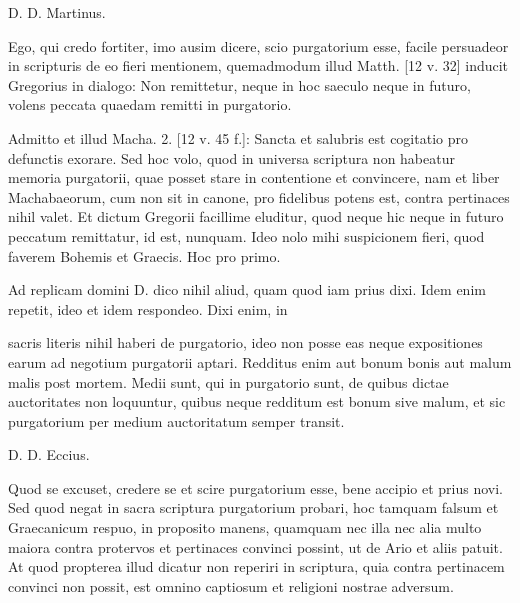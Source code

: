 D. D. Martinus.

Ego, qui credo fortiter, imo ausim dicere, scio purgatorium esse, facile persuadeor in scripturis de eo fieri mentionem, quemadmodum illud Matth. [12 v. 32] inducit Gregorius in dialogo: Non remittetur, neque in hoc saeculo neque in futuro, volens peccata quaedam remitti in purgatorio.

Admitto et illud Macha. 2. [12 v. 45 f.]: Sancta et salubris est cogitatio pro defunctis exorare. Sed hoc volo, quod in universa scriptura non habeatur memoria purgatorii, quae posset stare in contentione et convincere, nam et liber Machabaeorum, cum non sit in canone, pro fidelibus potens est, contra pertinaces nihil valet. Et dictum Gregorii facillime eluditur, quod neque hic neque in futuro peccatum remittatur, id est, nunquam. Ideo nolo mihi suspicionem fieri, quod faverem Bohemis et Graecis. Hoc pro primo.

Ad replicam domini D. dico nihil aliud, quam quod iam prius dixi. Idem enim repetit, ideo et idem respondeo. Dixi enim, in

sacris literis nihil haberi de purgatorio, ideo non posse eas neque expositiones earum ad negotium purgatorii aptari. Redditus enim aut bonum bonis aut malum malis post mortem. Medii sunt, qui in purgatorio sunt, de quibus dictae auctoritates non loquuntur, quibus neque redditum est bonum sive malum, et sic purgatorium per medium auctoritatum semper transit.

D. D. Eccius.

Quod se excuset, credere se et scire purgatorium esse, bene accipio et prius novi. Sed quod negat in sacra scriptura purgatorium probari, hoc tamquam falsum et Graecanicum respuo, in proposito manens, quamquam nec illa nec alia multo maiora contra protervos et pertinaces convinci possint, ut de Ario et aliis patuit. At quod propterea illud dicatur non reperiri in scriptura, quia contra pertinacem convinci non possit, est omnino captiosum et religioni nostrae adversum.

